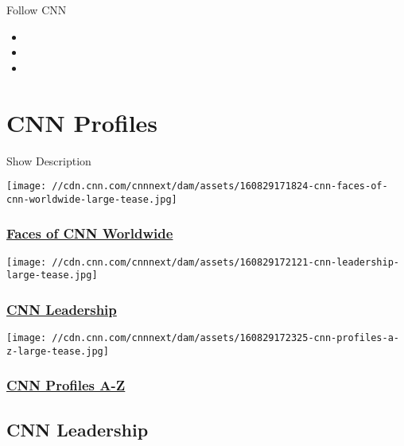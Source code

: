 Follow CNN

\begin{itemize}
\item
\item
\item
\end{itemize}

\hypertarget{cnn-profiles}{%
\section{CNN Profiles}\label{cnn-profiles}}

Show Description

\href{/specials/tv/anchors-and-reporters}{}

\texttt{[image: //cdn.cnn.com/cnnnext/dam/assets/160829171824-cnn-faces-of-cnn-worldwide-large-tease.jpg]}

\hypertarget{faces-of-cnn-worldwide}{%
\subsubsection{\texorpdfstring{\href{/specials/tv/anchors-and-reporters}{Faces
of CNN
Worldwide}}{Faces of CNN Worldwide}}\label{faces-of-cnn-worldwide}}

\href{/specials/more/cnn-leadership}{}

\texttt{[image: //cdn.cnn.com/cnnnext/dam/assets/160829172121-cnn-leadership-large-tease.jpg]}

\hypertarget{cnn-leadership}{%
\subsubsection{\texorpdfstring{\href{/specials/more/cnn-leadership}{CNN
Leadership}}{CNN Leadership}}\label{cnn-leadership}}

\href{/specials/profiles}{}

\texttt{[image: //cdn.cnn.com/cnnnext/dam/assets/160829172325-cnn-profiles-a-z-large-tease.jpg]}

\hypertarget{cnn-profiles-a-z}{%
\subsubsection{\texorpdfstring{\href{/specials/profiles}{CNN Profiles
A-Z}}{CNN Profiles A-Z}}\label{cnn-profiles-a-z}}

\hypertarget{cnn-leadership-}{%
\subsection{CNN Leadership~}\label{cnn-leadership-}}


